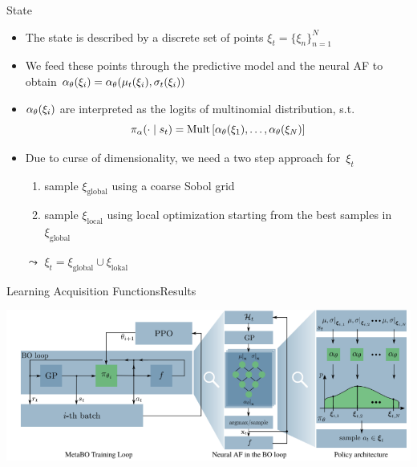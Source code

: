 \begin{frame}[c]{State }

\begin{itemize}
\item The state is described by a discrete set of points $\xi_t = \{\xi_n\}^N_{n=1}$
\pause
\item We feed these points through the predictive model and the neural AF to obtain $\alpha_\theta(\xi_i) = \alpha_\theta(\mu_t(\xi_i), \sigma_t(\xi_i)) $
\pause
\item $\alpha_\theta(\xi_i)$ are interpreted as the logits of multinomial distribution, s.t.
$$\pi_\alpha(\cdot \mid s_t) = \text{Mult}\left[\alpha_\theta(\xi_1), \ldots, \alpha_\theta(\xi_N) \right] $$
\pause
\item Due to curse of dimensionality, we need a two step approach for~$\xi_t$
\begin{enumerate}
\item sample $\xi_{\text{global}}$ using a coarse Sobol grid
\item sample $\xi_{\text{local}}$ using local optimization starting from the best samples in $\xi_{\text{global}}$
\end{enumerate}
\item[$\leadsto$] $\xi_t = \xi_{\text{global}} \cup \xi_{\text{lokal}}$ 
\end{itemize}

\end{frame}
\begin{frame}[c,fragile]{Learning Acquisition Functions\newline Results }

\centering
\includegraphics[width=1.0\textwidth]{images/l2acq.png}


\end{frame}
